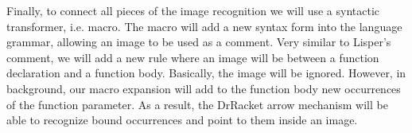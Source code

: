 Finally, to connect all pieces of the image recognition we will use a syntactic transformer, i.e. macro. The macro will add a new syntax form into the language grammar, allowing an image to be used as a comment. Very similar to Lisper's comment, we will add a new rule where an image will be between a function declaration and a function body. Basically, the image will be ignored. However, in background, our macro expansion will add to the function body new occurrences of the function parameter. As a result, the DrRacket arrow mechanism will be able to recognize bound occurrences and point to them inside an image.

